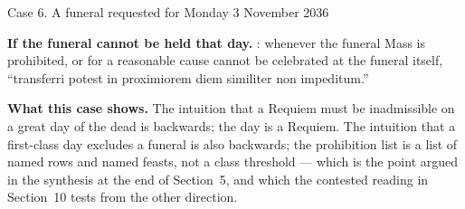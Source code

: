 \begin{casebox}{Case 6. A funeral requested for Monday 3 November 2036}
\begin{steps}
\item \textbf{If the funeral cannot be held that day.} : whenever the
funeral Mass is prohibited, or for a reasonable cause cannot be celebrated at
the funeral itself, ``transferri potest in proximiorem diem similiter non
impeditum.''
\end{steps}

\textbf{What this case shows.} The intuition that a Requiem must be
inadmissible on a great day of the dead is backwards; the day is a Requiem. The
intuition that a first-class day excludes a funeral is also backwards; the
prohibition list is a list of named rows and named feasts, not a class
threshold --- which is the point argued in the synthesis at the end of
Section~5, and which the contested reading in Section~10 tests from the other
direction.
\end{casebox}
